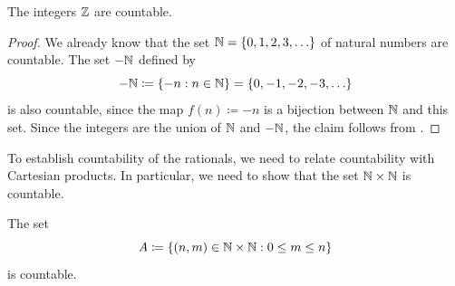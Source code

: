 \begin{cor}\label{i:8.1.11}
  The integers \(\mathbb{Z}\) are countable.
\end{cor}

\begin{proof}
  We already know that the set \(\N = \set{0, 1, 2, 3, \dots}\) of natural numbers are countable.
  The set \(-\mathbb{N}\) defined by
  \[
    -\N \coloneqq \set{-n : n \in \N} = \set{0, -1, -2, -3, \dots}
  \]
  is also countable, since the map \(f(n) \coloneqq -n\) is a bijection between \(\mathbb{N}\) and this set.
  Since the integers are the union of \(\mathbb{N}\) and \(-\mathbb{N}\), the claim follows from .
\end{proof}

\begin{note}
  To establish countability of the rationals, we need to relate countability with Cartesian products.
  In particular, we need to show that the set \(\mathbb{N} \times \mathbb{N}\) is countable.
\end{note}

\begin{lem}\label{i:8.1.12}
  The set
  \[
    A \coloneqq \left\lbrace(n, m) \in \mathbb{N} \times \mathbb{N} : 0 \leq m \leq n\right\rbrace
  \]
  is countable.
\end{lem}

